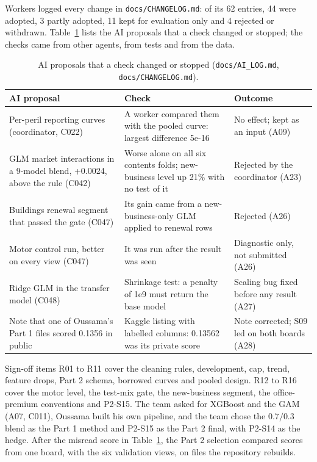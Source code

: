 \documentclass{rapport}
\begin{document}
Workers logged every change in \texttt{docs/CHANGELOG.md}: of its 62 entries, 44 were adopted, 3 partly adopted, 11
kept for evaluation only and 4 rejected or withdrawn. Table~\ref{ov:tab-ai} lists the AI proposals that a check changed
or stopped; the checks came from other agents, from tests and from the data.

\begin{table}[h]
\centering
\small
\begin{tabular}{p{4.2cm}p{6.0cm}p{4.0cm}}
\hline
AI proposal & Check & Outcome\\
\hline
Per-peril reporting curves (coordinator, C022) & A worker compared them with the pooled curve: largest difference 5e-16 & No effect; kept as an input (A09)\\
GLM market interactions in a 9-model blend, +0.0024, above the rule (C042) & Worse alone on all six contents folds; new-business level up 21\% with no test of it & Rejected by the coordinator (A23)\\
Buildings renewal segment that passed the gate (C047) & Its gain came from a new-business-only GLM applied to renewal rows & Rejected (A26)\\
Motor control run, better on every view (C047) & It was run after the result was seen & Diagnostic only, not submitted (A26)\\
Ridge GLM in the transfer model (C048) & Shrinkage test: a penalty of 1e9 must return the base model & Scaling bug fixed before any result (A27)\\
Note that one of Oussama's Part 1 files scored 0.1356 in public & Kaggle listing with labelled columns: 0.13562 was its private score & Note corrected; S09 led on both boards (A28)\\
\hline
\end{tabular}
\caption{AI proposals that a check changed or stopped (\texttt{docs/AI\_LOG.md}, \texttt{docs/CHANGELOG.md}).}
\label{ov:tab-ai}
\end{table}

Sign-off items R01 to R11 cover the cleaning rules, development, cap, trend, feature drops, Part 2 schema, borrowed
curves and pooled design. R12 to R16 cover the motor level, the test-mix gate, the new-business segment, the
office-premium conventions and P2-S15. The team asked for XGBoost and the GAM (A07, C011), Oussama built his own
pipeline, and the team chose the $0.7/0.3$ blend as the Part 1 method and P2-S15 as the Part 2 final, with P2-S14
as the hedge. After the misread score in Table~\ref{ov:tab-ai}, the Part 2 selection compared scores from one board, with
the six validation views, on files the repository rebuilds.
\end{document}
